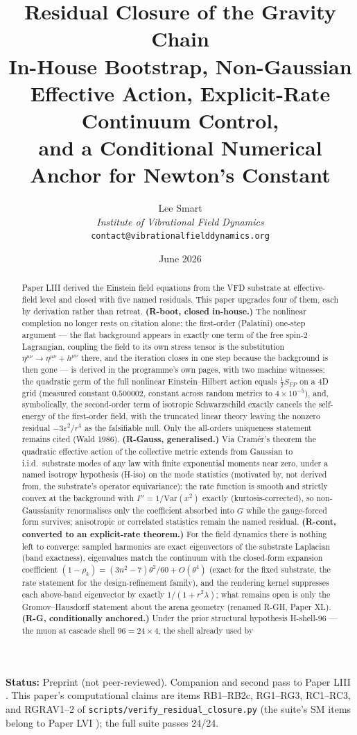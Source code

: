 \documentclass[12pt]{article}
\title{Residual Closure of the Gravity Chain\\[6pt]
\large In-House Bootstrap, Non-Gaussian Effective Action, Explicit-Rate Continuum Control,\\ and a Conditional Numerical Anchor for Newton's Constant}
\author{Lee Smart\\ \textit{Institute of Vibrational Field Dynamics}\\ \texttt{contact@vibrationalfielddynamics.org}}
\date{June 2026}
\theoremstyle{definition}
\theoremstyle{remark}
\begin{document}
\maketitle

\noindent\textbf{Status:} Preprint (not peer-reviewed). Companion and second pass to Paper LIII \citep{SmartLIII}. This paper's computational claims are items RB1--RB2c, RG1--RG3, RC1--RC3, and RGRAV1--2 of \texttt{scripts/verify\_residual\_closure.py} (the suite's SM items belong to Paper LVI \citep{SmartLVI}); the full suite passes 24/24.

\begin{abstract}
Paper LIII derived the Einstein field equations from the VFD substrate at effective-field level and closed with five named residuals. This paper upgrades four of them, each by derivation rather than retreat. \textbf{(R-boot, closed in-house.)} The nonlinear completion no longer rests on citation alone: the first-order (Palatini) one-step argument --- the flat background appears in exactly one term of the free spin-2 Lagrangian, coupling the field to its own stress tensor is the substitution $\eta^{\mu\nu} \to \eta^{\mu\nu} + h^{\mu\nu}$ there, and the iteration closes in one step because the background is then gone --- is derived in the programme's own pages, with two machine witnesses: the quadratic germ of the full nonlinear Einstein--Hilbert action equals $\tfrac12 S_{FP}$ on a 4D grid (measured constant $0.500002$, constant across random metrics to $4\times10^{-5}$), and, symbolically, the second-order term of isotropic Schwarzschild exactly cancels the self-energy of the first-order field, with the truncated linear theory leaving the nonzero residual $-3\varepsilon^2/r^4$ as the falsifiable null. Only the all-orders uniqueness statement remains cited (Wald 1986). \textbf{(R-Gauss, generalised.)} Via Cram\'er's theorem the quadratic effective action of the collective metric extends from Gaussian to i.i.d.\ substrate modes of any law with finite exponential moments near zero, under a named isotropy hypothesis (H-iso) on the mode statistics (motivated by, not derived from, the substrate's operator equivariance): the rate function is smooth and strictly convex at the background with $I'' = 1/\mathrm{Var}(x^2)$ exactly (kurtosis-corrected), so non-Gaussianity renormalises only the coefficient absorbed into $G$ while the gauge-forced form survives; anisotropic or correlated statistics remain the named residual. \textbf{(R-cont, converted to an explicit-rate theorem.)} For the field dynamics there is nothing left to converge: sampled harmonics are exact eigenvectors of the substrate Laplacian (band exactness), eigenvalues match the continuum with the closed-form expansion coefficient $(1-\rho_k) = (3n^2{-}7)\theta^2/60 + O(\theta^4)$ (exact for the fixed substrate, the rate statement for the design-refinement family), and the rendering kernel suppresses each above-band eigenvector by exactly $1/(1+r^2\lambda)$; what remains open is only the Gromov--Hausdorff statement about the arena geometry (renamed R-GH, Paper XL). \textbf{(R-G, conditionally anchored.)} Under the prior structural hypothesis H-shell-96 --- the muon at cascade shell $96 = 24\times4$, the shell already used by 
\end{abstract}
\end{document}
